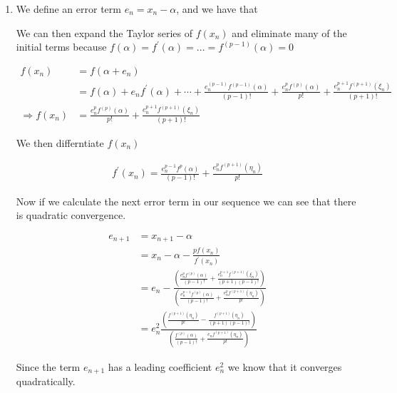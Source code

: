 {\begin{enumerate}
\item


We define an error term $e_n = x_n - \alpha$, and we have that

We can then expand the Taylor series of $f(x_n)$ and eliminate many of
the initial terms because $f(\alpha) = f^\prime(\alpha) = \dots = f^{(p-1)}(\alpha) = 0$

\[
\begin{aligned}
f(x_n) &= f(\alpha + e_n) \\
&= f(\alpha) + e_n f^\prime (\alpha) + \cdots + \frac{e_n^{(p-1)} f^{(p-1)}(\alpha)}{(p-1)!} + \frac{e_n^p f^{(p)} (\alpha)}{p!}
+ \frac{e_n^{p+1} f^{(p+1)} (\xi_n)}{(p+1)!} \\
\Rightarrow f(x_n) &= \frac{e_n^p f^{(p)}(\alpha)}{p!} + \frac{e_n^{p+1} f^{(p+1)} (\xi_n)}{(p+1)!}
\end{aligned}
\]

We then differntiate $f(x_n)$

\[
\begin{aligned}
f^\prime (x_n) = \frac{e_n^{p-1} f^p (\alpha)}{(p-1)!} + \frac{e_n^p f^{(p+1)} (\eta_n)}{p!}
\end{aligned}
\]

Now if we calculate the next error term in our sequence we can see
that there is quadratic convergence.

\[
\begin{aligned}
e_{n+1} &= x_{n+1} - \alpha \\
&= x_n - \alpha - \frac{p f(x_n)}{f^\prime (x_n)}\\
&= e_n - \frac{\left(
\frac{e_n^p f^{(p)}(\alpha)}{(p-1)!} + \frac{e_n^{p+1} f^{(p+1)}(\xi_n)}{(p+1)(p-1)!}
\right)}{\left(
\frac{e_n^{p-1} f^{(p)}(\alpha)}{(p-1)!} + \frac{e_n^p f^{(p+1)}(\eta_n)}{p!}
\right)} \\
&= e_n^2 \frac{\left(
\frac{f^{(p+1)}(\eta_n)}{p!} - \frac{f^{(p+1)} (\eta_n)}{(p+1)(p-1)!}
\right)}
{\left(
\frac{f^{(p)}(\alpha)}{(p-1)!} +
\frac{e_n f^{(p+1)}(\eta_n)}{p!}
\right)}
\end{aligned}
\]

Since the term $e_{n+1}$ has a leading coefficient $e_n^2$ we know
that it converges quadratically.


\end{enumerate}

}
